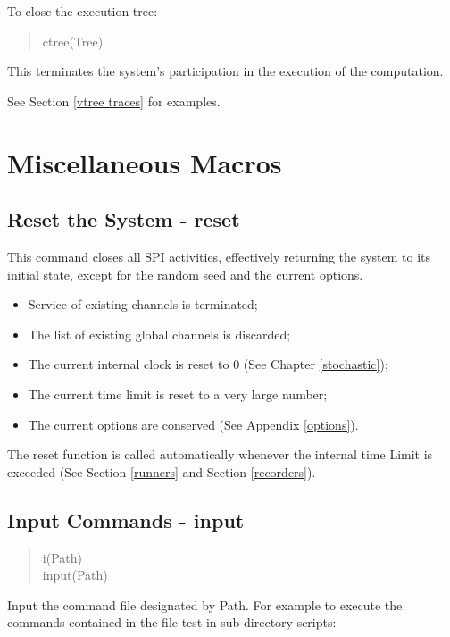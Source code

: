 \noindent
To close the execution tree:

\begin{verse}
    ctree(Tree)
\end{verse}

\noindent
This terminates the system's
participation in the execution of the computation.

\noindent
See Section \ref{vtree traces} for examples.

\section{Miscellaneous Macros}

\subsection{Reset the System - reset}

\label{reset}
This command closes all SPI activities,
effectively returning the system to its initial state,
except for the random seed and the current options.
\begin{itemize}
\item Service of existing channels is terminated;
\item The list of existing global channels is discarded;
\item The current internal clock is reset to 0
      (See Chapter \ref{stochastic});
\item The current time limit is reset to a very large number;
\item The current options are conserved (See Appendix \ref{options}).
\end{itemize}

\noindent
The reset function is called automatically whenever the internal
time Limit is exceeded
(See Section \ref{runners} and  Section \ref{recorders}).

\subsection{Input Commands - input}

\begin{verse}
    i(Path) \\
    input(Path)
\end{verse}

\noindent
Input the command file designated by Path.  For example to execute
the commands contained in the file test in sub-directory scripts:

